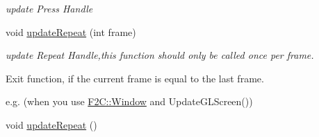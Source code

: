 \begin{DoxyCompactItemize}
\begin{DoxyCompactList}\small\item\em update Press Handle \item\end{DoxyCompactList}\item 
void \hyperlink{class_f2_c_1_1_input_a95ad2099b6d764658afd714fed48d2cf}{updateRepeat} (int frame)
\begin{DoxyCompactList}\small\item\em update Repeat Handle,this function should only be called once per frame. \par
 Exit function, if the current frame is equal to the last frame. \par
 e.g. (when you use \hyperlink{class_f2_c_1_1_window}{F2C::Window} and UpdateGLScreen()) \par
 \item\end{DoxyCompactList}\item 
\hypertarget{class_f2_c_1_1_input_addddf13154ab0e5fd56026f25cfa404b}{
void \hyperlink{class_f2_c_1_1_input_addddf13154ab0e5fd56026f25cfa404b}{updateRepeat} ()}
\label{class_f2_c_1_1_input_addddf13154ab0e5fd56026f25cfa404b}


\end{DoxyCompactItemize}

